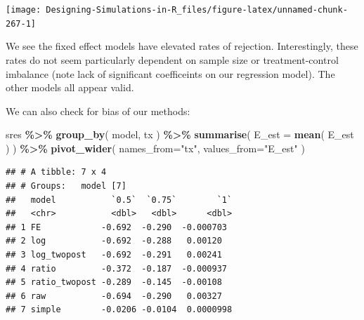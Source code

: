 \documentclass[
]{book}
\newenvironment{Shaded}{\begin{snugshade}}{\end{snugshade}}
\newcommand{\AttributeTok}[1]{\textcolor[rgb]{0.13,0.29,0.53}{#1}}
\newcommand{\DecValTok}[1]{\textcolor[rgb]{0.00,0.00,0.81}{#1}}
\newcommand{\FloatTok}[1]{\textcolor[rgb]{0.00,0.00,0.81}{#1}}
\newcommand{\FunctionTok}[1]{\textcolor[rgb]{0.13,0.29,0.53}{\textbf{#1}}}
\newcommand{\NormalTok}[1]{#1}
\newcommand{\SpecialCharTok}[1]{\textcolor[rgb]{0.81,0.36,0.00}{\textbf{#1}}}
\newcommand{\StringTok}[1]{\textcolor[rgb]{0.31,0.60,0.02}{#1}}
\begin{document}
\begin{Shaded}
\end{Shaded}

\begin{center}\texttt{[image: Designing-Simulations-in-R\_files/figure-latex/unnamed-chunk-267-1]} \end{center}

We see the fixed effect models have elevated rates of rejection.
Interestingly, these rates do not seem particularly dependent on sample size or treatment-control imbalance (note lack of significant coefficeints on our regression model).
The other models all appear valid.

We can also check for bias of our methods:

\begin{Shaded}
\begin{Highlighting}[]
\NormalTok{sres }\SpecialCharTok{\%\textgreater{}\%} \FunctionTok{group\_by}\NormalTok{( model, tx ) }\SpecialCharTok{\%\textgreater{}\%}
  \FunctionTok{summarise}\NormalTok{( }\AttributeTok{E\_est =} \FunctionTok{mean}\NormalTok{( E\_est ) ) }\SpecialCharTok{\%\textgreater{}\%}
  \FunctionTok{pivot\_wider}\NormalTok{( }\AttributeTok{names\_from=}\StringTok{"tx"}\NormalTok{, }\AttributeTok{values\_from=}\StringTok{"E\_est"}\NormalTok{ )}
\end{Highlighting}
\end{Shaded}

\begin{verbatim}
## # A tibble: 7 x 4
## # Groups:   model [7]
##   model           `0.5`  `0.75`        `1`
##   <chr>           <dbl>   <dbl>      <dbl>
## 1 FE            -0.692  -0.290  -0.000703 
## 2 log           -0.692  -0.288   0.00120  
## 3 log_twopost   -0.692  -0.291   0.00241  
## 4 ratio         -0.372  -0.187  -0.000937 
## 5 ratio_twopost -0.289  -0.145  -0.00108  
## 6 raw           -0.694  -0.290   0.00327  
## 7 simple        -0.0206 -0.0104  0.0000998
\end{verbatim}
\end{document}
